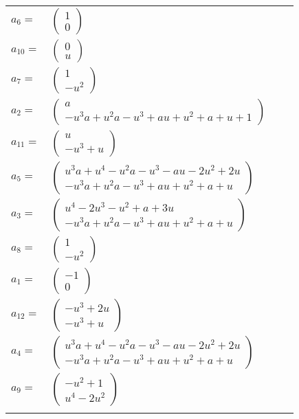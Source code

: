 \documentclass[1p]{elsarticle_modified}
\theoremstyle{definition}
\begin{document}
\begin{tabular}{m{7pt} m{180pt} m{7pt} m{180pt} }
\flushright $a_{6}=$&$\begin{pmatrix}1\\0\end{pmatrix}$ \\
\flushright $a_{10}=$&$\begin{pmatrix}0\\u\end{pmatrix}$ \\
\flushright $a_{7}=$&$\begin{pmatrix}1\\- u^2\end{pmatrix}$ \\
\flushright $a_{2}=$&$\begin{pmatrix}a\\- u^3 a+u^2 a- u^3+a u+u^2+a+u+1\end{pmatrix}$ \\
\flushright $a_{11}=$&$\begin{pmatrix}u\\- u^3+u\end{pmatrix}$ \\
\flushright $a_{5}=$&$\begin{pmatrix}u^3 a+u^4- u^2 a- u^3- a u-2 u^2+2 u\\- u^3 a+u^2 a- u^3+a u+u^2+a+u\end{pmatrix}$ \\
\flushright $a_{3}=$&$\begin{pmatrix}u^4-2 u^3- u^2+a+3 u\\- u^3 a+u^2 a- u^3+a u+u^2+a+u\end{pmatrix}$ \\
\flushright $a_{8}=$&$\begin{pmatrix}1\\- u^2\end{pmatrix}$ \\
\flushright $a_{1}=$&$\begin{pmatrix}-1\\0\end{pmatrix}$ \\
\flushright $a_{12}=$&$\begin{pmatrix}- u^3+2 u\\- u^3+u\end{pmatrix}$ \\
\flushright $a_{4}=$&$\begin{pmatrix}u^3 a+u^4- u^2 a- u^3- a u-2 u^2+2 u\\- u^3 a+u^2 a- u^3+a u+u^2+a+u\end{pmatrix}$ \\
\flushright $a_{9}=$&$\begin{pmatrix}- u^2+1\\u^4-2 u^2\end{pmatrix}$\\&\end{tabular}
\end{document}
